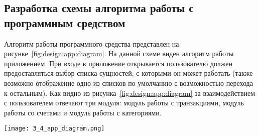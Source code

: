 \subsection{Разработка схемы алгоритма работы с программным средством}
\label{sec:design:app}

Алгоритм работы программного средства представлен на рисунке~\ref{fig:design:app:diagram}.
На данной схеме виден алгоритм работы приложением.
При входе в приложение открывается пользователю должен предоставляться выбор списка сущностей, с которыми он может работать (также возможно отображение одно из списков по умолчанию с возможностью перехода к остальным).
Как видно из рисунка~\ref{fig:design:app:diagram} за взаимодействием с пользователем отвечают три модуля: модуль работы с транзакциями, модуль работы со счетами и модуль работы с категориями.

\begin{sidewaysfigure}
    \centering
    \texttt{[image: 3\_4\_app\_diagram.png]}
    \caption{Схема программного средства}
    \label{fig:design:app:diagram}
\end{sidewaysfigure}


